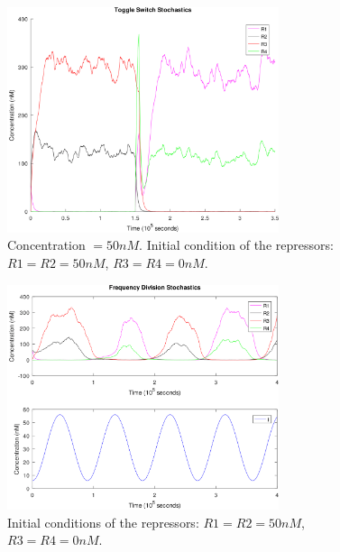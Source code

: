     \begin{figure}[!htbp]
      \centering
      \includegraphics[width=0.71\textwidth]{img/stochastic-switch-3-1.png}
      \caption{Concentration $= 50nM$. Initial condition of the repressors: $R1 = R2 = 50nM$, $R3 = R4 = 0nM$.}
      \label{fig.stochastic-switch-3}
    \end{figure}

    \begin{figure}[!htbp]
      \centering
      \includegraphics[width=0.71\textwidth]{img/stochastic-freqdiv-normal-1.png}
      \caption{Initial conditions of the repressors: $R1 = R2 = 50nM$, $R3 = R4 = 0nM$.}
      \label{fig.stochastic-freqdiv-normal}
    \end{figure}

